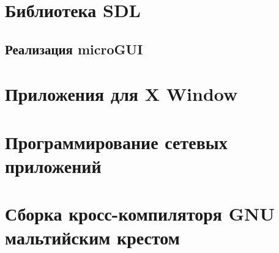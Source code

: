 \chapter{Библиотека SDL}

\section{Реализация microGUI}

\chapter{Приложения для X Window}

\chapter{Программирование сетевых приложений}

\chapter{Сборка кросс-компиляторя GNU мальтийским крестом}











\printbibliography


